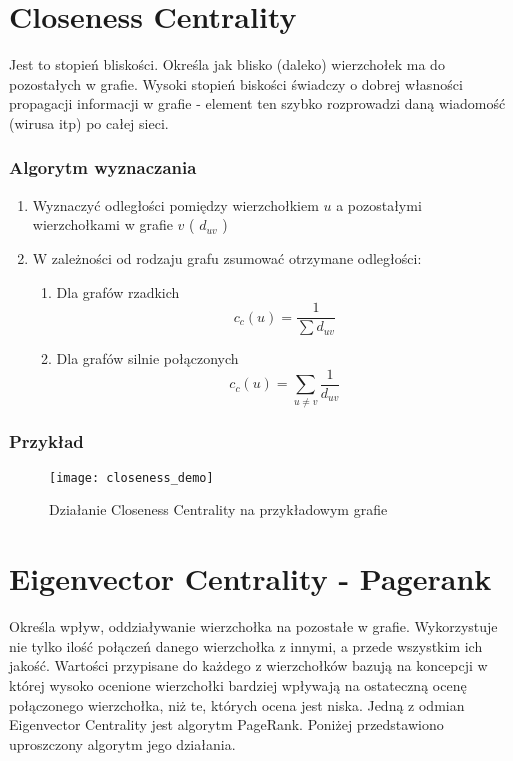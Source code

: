 \section{Closeness Centrality}

Jest to stopień bliskości. Określa jak blisko (daleko) wierzchołek ma do pozostałych w grafie. Wysoki stopień biskości świadczy o dobrej własności propagacji informacji w grafie - element ten szybko rozprowadzi daną wiadomość (wirusa itp) po całej sieci.


\subsubsection{Algorytm wyznaczania}
\begin{enumerate}
\item Wyznaczyć odległości pomiędzy wierzchołkiem $u$ a pozostałymi wierzchołkami w grafie $v$  ( $d_{uv}$ )
\item W zależności od rodzaju grafu zsumować otrzymane odległości:
\begin{enumerate}
\item Dla grafów rzadkich $$ c_c(u) = \frac{1}{\sum d_{uv} }$$
\item Dla grafów silnie połączonych $$ c_c(u) = \sum_{u \neq v} \frac{1}{d_{uv} }$$
\end{enumerate}
\end{enumerate}

\FloatBarrier
\subsubsection{Przykład}
\begin{figure}[h]
\centering
\texttt{[image: closeness\_demo]}
\caption{Działanie Closeness Centrality  na przykładowym grafie}
\end{figure}
\FloatBarrier

\section{Eigenvector Centrality - Pagerank}
Określa wpływ, oddziaływanie wierzchołka na pozostałe w grafie. Wykorzystuje nie tylko ilość połączeń danego wierzchołka z innymi, a przede wszystkim ich jakość. Wartości przypisane do każdego z wierzchołków bazują na koncepcji w której wysoko ocenione wierzchołki bardziej wpływają na ostateczną ocenę połączonego wierzchołka, niż te, których ocena jest niska. Jedną z odmian Eigenvector Centrality jest algorytm PageRank. Poniżej przedstawiono uproszczony algorytm jego działania.

